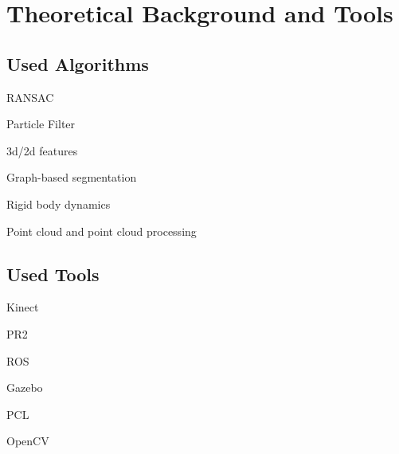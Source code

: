 \chapter{Theoretical Background and Tools}
\label{chapter:Background}

\section{Used Algorithms}
\item RANSAC
\item Particle Filter
\item 3d/2d features
\item Graph-based segmentation
\item Rigid body dynamics
\item Point cloud and point cloud processing

\section{Used Tools}
\item Kinect
\item PR2
\item ROS
\item Gazebo
\item PCL
\item OpenCV





